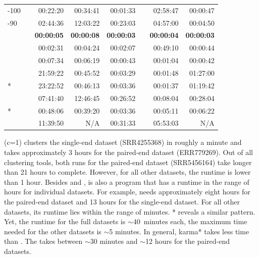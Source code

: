 \documentclass[12pt,a4paper,english]{article}
\begin{document}
\begin{table}[H]
{\begin{tabular}{@{}lrrrrrrr@{}}
					\cdhit{}-100 &  & 00:22:20 & 00:34:41 & 00:01:33 &  & 02:58:47 & 00:00:47 \\ \addlinespace
					\cdhit{}-90 &  & 02:44:36 & 12:03:22 & 00:23:03 &  & 04:57:00 & 00:04:50 \\ \addlinespace
					\linclust &  & \textbf{00:00:05} & \textbf{00:00:08} & \textbf{00:00:03} &  & \textbf{00:00:04} & \textbf{00:00:03} \\ \addlinespace
					\mclust &  & 00:02:31 & 00:04:24 & 00:02:07 &  & 00:49:10 & 00:00:44 \\ \addlinespace
					\mclusttwo &  & 00:07:34 & 00:06:19 & 00:00:43 &  & 00:01:04 & 00:00:42 \\ \addlinespace
					\grouper &  & 21:59:22 & 00:45:52 & 00:03:29 &  & 00:01:48 & 01:27:00 \\ \addlinespace
					\grouper{}* &  & 23:22:52 & 00:46:13 & 00:03:36 &  & 00:01:37 & 01:19:42 \\ \addlinespace
					\karma &  & 07:41:40 & 12:46:45 & 00:26:52 &  & 00:08:04 & 00:28:04 \\ \addlinespace
					\karma{}* &  & 00:48:06 & 00:39:20 & 00:03:36 &  & 00:05:11 & 00:06:22 \\ \addlinespace
					\orp & & 11:39:50 & N/A & 00:31:33 &  & 05:53:03 & N/A \\ \bottomrule
				\end{tabular}%
			}
			\label{table:runtimes}
		\end{table}
        \cdhit (c=1) clusters the single-end \ecoli dataset (SRR4255368) in roughly a minute and takes approximately 3 hours for the paired-end \ecoli dataset (ERR779269).
		Out of all clustering tools, both \grouper runs for the paired-end \celegans dataset (SRR5456164) take longer than 21 hours to complete. However, for all other datasets, the runtime is lower than 1 hour.
		Besides \cdhit and \grouper, \karma is also a program that has a runtime in the range of hours for individual datasets. For example, \karma needs approximately eight hours for the paired-end \celegans dataset and 13 hours for the single-end \celegans dataset. For all other datasets, its runtime lies within the range of minutes. \karma{}* reveals a similar pattern. Yet, the runtime for the full \celegans datasets is $\sim$40~minutes each, the maximum time needed for the other datasets is $\sim$5 minutes. In general, karma{}* takes less time than \karma.
		The \orp takes between $\sim$30 minutes and $\sim$12 hours for the paired-end datasets.
\end{document}
